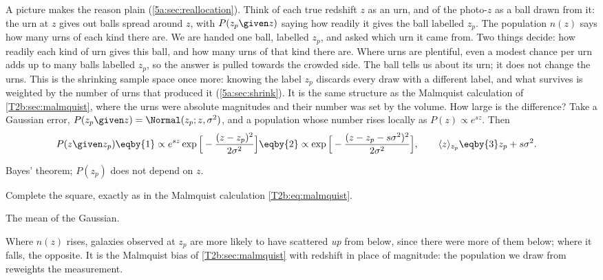 A picture makes the reason plain (\cref{5a:sec:reallocation}). Think of each true redshift $z$ as an urn, and of the photo-$z$ as a ball drawn from it: the urn at $z$ gives out balls spread around $z$, with $P(z_p\given z)$ saying how readily it gives the ball labelled $z_p$. The population $n(z)$ says how many urns of each kind there are. We are handed one ball, labelled $z_p$, and asked which urn it came from. Two things decide: how readily each kind of urn gives this ball, and how many urns of that kind there are. Where urns are plentiful, even a modest chance per urn adds up to many balls labelled $z_p$, so the answer is pulled towards the crowded side. The ball tells us about its urn; it does not change the urns. This is the shrinking sample space once more: knowing the label $z_p$ discards every draw with a different label, and what survives is weighted by the number of urns that produced it (\cref{5a:sec:shrink}). It is the same structure as the Malmquist calculation of \cref{T2b:sec:malmquist}, where the urns were absolute magnitudes and their number was set by the volume. How large is the difference? Take a Gaussian error, $P(z_p\given z)=\Normal(z_p;z,\sigma^2)$, and a population whose number rises locally as $P(z)\propto e^{sz}$. Then
\begin{align}
  P(z\given z_p)
  &\eqby{1}\propto e^{sz}\exp\Big[-\frac{(z-z_p)^2}{2\sigma^2}\Big]
  \eqby{2}\propto\exp\Big[-\frac{(z-z_p-s\sigma^2)^2}{2\sigma^2}\Big],
  \qquad
  \langle z\rangle_{z_p}\eqby{3}z_p+s\sigma^2 .
  \label{T2b:eq:photoz-bayes}
\end{align}
\begin{explain}
  \item Bayes' theorem; $P(z_p)$ does not depend on $z$.
  \item Complete the square, exactly as in the Malmquist calculation \eqref{T2b:eq:malmquist}.
  \item The mean of the Gaussian.
\end{explain}
Where $n(z)$ rises, galaxies observed at $z_p$ are more likely to have scattered \emph{up} from below, since there were more of them below; where it falls, the opposite. It is the Malmquist bias of \cref{T2b:sec:malmquist} with redshift in place of magnitude: the population we draw from reweights the measurement.

